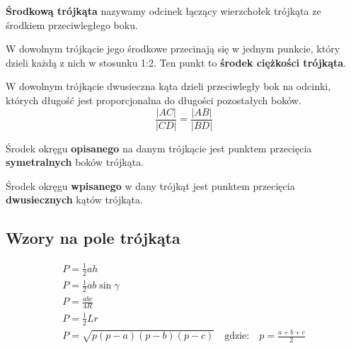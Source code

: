 \begin{definition}
  \textbf{Środkową trójkąta} nazywamy odcinek łączący wierzchołek trójkąta ze środkiem przeciwległego boku.
\end{definition}

\begin{theorem}
  W dowolnym trójkącie jego środkowe przecinają się w jednym punkcie, który dzieli każdą z nich w
  stosunku 1:2. Ten punkt to \textbf{środek ciężkości trójkąta}.
\end{theorem}

\begin{theorem}
  W dowolnym trójkącie dwusieczna kąta dzieli przeciwległy bok na odcinki, których długość jest
  proporcjonalna do długości pozostałych boków.
  \begin{equation}
    \frac{|AC|}{|CD|} = \frac{|AB|}{|BD|}
  \end{equation}
\end{theorem}

\begin{theorem}
  Środek okręgu \textbf{opisanego} na danym trójkącie jest punktem przecięcia \textbf{symetralnych}
  boków trójkąta.
\end{theorem}

\begin{theorem}
  Środek okręgu \textbf{wpisanego} w dany trójkąt jest punktem przecięcia \textbf{dwusiecznych}
  kątów trójkąta.
\end{theorem}

\subsection{Wzory na pole trójkąta}
\begin{subequations}
  \begin{gather}
    P = \frac 1 2 ah\\
    P = \frac 1 2 ab \sin \gamma\\
    P = \frac{abc}{4R}\\
    P = \frac 1 2 Lr\\
    P = \sqrt{p(p-a)(p-b)(p-c)}\quad \text{gdzie:}\quad p = \frac{a+b+c}{2}
  \end{gather}
\end{subequations}

